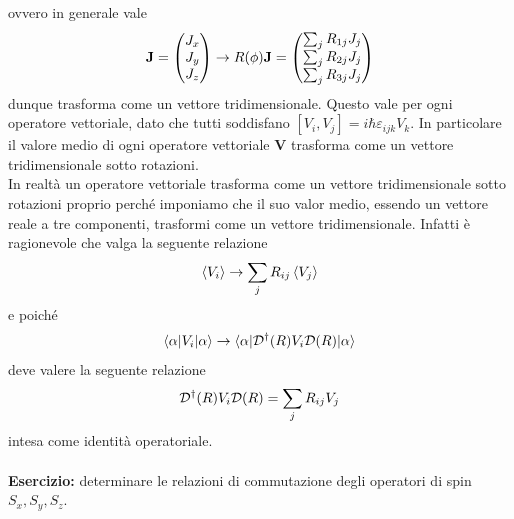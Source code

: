 \documentclass{article}
\begin{document}
ovvero in generale vale
\begin{gather}
    \mathbf{J} = \begin{pmatrix}
        J_x \\
        J_y \\
        J_z
    \end{pmatrix} \rightarrow R(\phi)\mathbf{J} = \begin{pmatrix}
        \sum_j R_{1j}J_j \\
        \sum_j R_{2j}J_j \\
        \sum_j R_{3j}J_j
    \end{pmatrix} \notag
\end{gather}
dunque trasforma come un vettore tridimensionale. Questo vale per ogni operatore vettoriale, dato che tutti soddisfano $[V_i, V_j] = i\hbar\varepsilon_{ijk}V_k$. In particolare il valore medio di ogni operatore vettoriale $\mathbf{V}$ trasforma come un vettore tridimensionale sotto rotazioni. \\
In realtà un operatore vettoriale trasforma come un vettore tridimensionale sotto rotazioni proprio perché imponiamo che il suo valor medio, essendo un vettore reale a tre componenti, trasformi come un vettore tridimensionale. Infatti è ragionevole che valga la seguente relazione
\begin{gather}
    \braket{V_i} \rightarrow \sum_j R_{ij}\braket{V_j} \notag
\end{gather}
e poiché
\begin{gather}
    \braket{\alpha|V_i|\alpha} \rightarrow \braket{\alpha|\mathcal{D}^\dagger(R)V_i\mathcal{D}(R)|\alpha} \notag
\end{gather}
deve valere la seguente relazione
\begin{gather}
    \mathcal{D}^\dagger(R)V_i\mathcal{D}(R) = \sum_j R_{ij}V_j \notag
\end{gather}
intesa come identità operatoriale. \\ \\
\textbf{Esercizio:} determinare le relazioni di commutazione degli operatori di spin $S_x, S_y, S_z$. \\
\end{document}
